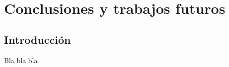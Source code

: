 \chapter{Conclusiones y trabajos futuros}\label{cap.conclusiones}
\section{Introducción}
Bla bla bla